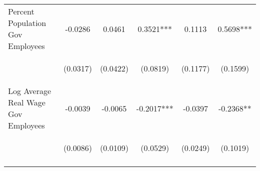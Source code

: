 \begin{center}
\begin{tabular}{lccccc}
\noalign{\smallskip}Percent Population Gov Employees & \begin{scriptsize}-0.0286\end{scriptsize} & \begin{scriptsize}0.0461\end{scriptsize} & \begin{scriptsize}0.3521***\end{scriptsize} & \begin{scriptsize}0.1113\end{scriptsize} & \begin{scriptsize}0.5698***\end{scriptsize}\\
 & \begin{scriptsize}(0.0317)\end{scriptsize} & \begin{scriptsize}(0.0422)\end{scriptsize} & \begin{scriptsize}(0.0819)\end{scriptsize} & \begin{scriptsize}(0.1177)\end{scriptsize} & \begin{scriptsize}(0.1599)\end{scriptsize}\\
\noalign{\smallskip}Log Average Real Wage Gov Employees & \begin{scriptsize}-0.0039\end{scriptsize} & \begin{scriptsize}-0.0065\end{scriptsize} & \begin{scriptsize}-0.2017***\end{scriptsize} & \begin{scriptsize}-0.0397\end{scriptsize} & \begin{scriptsize}-0.2368**\end{scriptsize}\\
 & \begin{scriptsize}(0.0086)\end{scriptsize} & \begin{scriptsize}(0.0109)\end{scriptsize} & \begin{scriptsize}(0.0529)\end{scriptsize} & \begin{scriptsize}(0.0249)\end{scriptsize} & \begin{scriptsize}(0.1019)\end{scriptsize}\\
\noalign{\smallskip}\hline\end{tabular}\\
\end{center}

